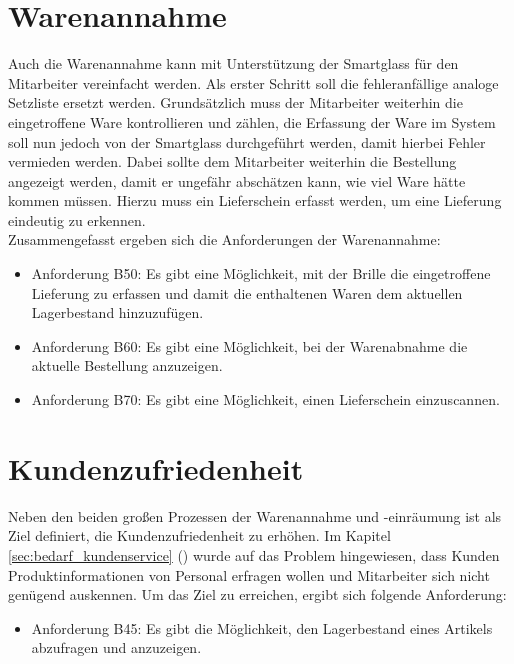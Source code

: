 \section{Warenannahme}
Auch die Warenannahme kann mit Unterstützung der Smartglass für den Mitarbeiter vereinfacht werden. Als erster Schritt soll die fehleranfällige analoge Setzliste ersetzt werden. Grundsätzlich muss der Mitarbeiter weiterhin die eingetroffene Ware kontrollieren und zählen, die Erfassung der Ware im System soll nun jedoch von der Smartglass durchgeführt werden, damit hierbei Fehler vermieden werden. Dabei sollte dem Mitarbeiter weiterhin die Bestellung angezeigt werden, damit er ungefähr abschätzen kann, wie viel Ware hätte kommen müssen. Hierzu muss \zB ein Lieferschein erfasst werden, um eine Lieferung eindeutig zu erkennen.\\
Zusammengefasst ergeben sich die Anforderungen der Warenannahme: 

\begin{itemize}
	\item Anforderung B50: Es gibt eine Möglichkeit, mit der Brille die eingetroffene Lieferung zu erfassen und damit die enthaltenen Waren dem aktuellen Lagerbestand hinzuzufügen. \label{anforderung_b50}
	\item Anforderung B60: Es gibt eine Möglichkeit, bei der Warenabnahme die aktuelle Bestellung anzuzeigen. \label{anforderung_b60}
	\item Anforderung B70: Es gibt eine Möglichkeit, einen Lieferschein einzuscannen. \label{anforderung_b70}
\end{itemize}

\section{Kundenzufriedenheit}
Neben den beiden großen Prozessen der Warenannahme und -einräumung ist als Ziel definiert, die Kundenzufriedenheit zu erhöhen. Im Kapitel \ref{sec:bedarf_kundenservice} () wurde auf das Problem hingewiesen, dass Kunden Produktinformationen von Personal erfragen wollen und Mitarbeiter sich nicht genügend auskennen. Um das Ziel zu erreichen, ergibt sich folgende Anforderung: 
\begin{itemize}
	\item Anforderung B45: Es gibt die Möglichkeit, den Lagerbestand eines Artikels abzufragen und anzuzeigen. \label{anforderung_b45}
\end{itemize}

